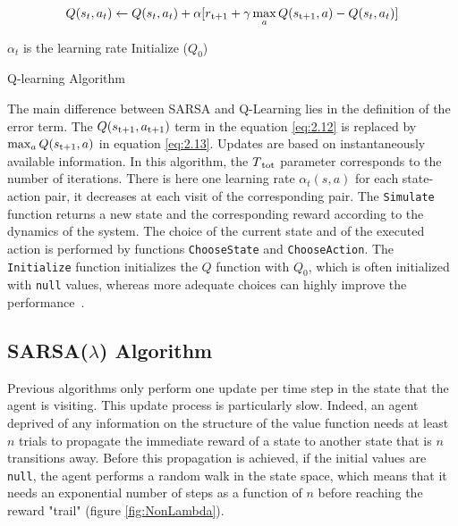 \begin{equation}
\label{eq:2.13}
	Q(s_t, a_t) \leftarrow Q(s_t, a_t) + \alpha[r\textsubscript{t+1} + \gamma \max_{a} Q(s\textsubscript{t+1}, a) - Q(s_t, a_t)]
\end{equation} 

\begin{algorithm}
	$\alpha_t$ is the learning rate \;
	Initialize ($Q_0$)\;
\caption{Q-learning Algorithm ~\cite{Sigaud:2010:MDP:1841781}}
\end{algorithm}

The main difference between SARSA and Q-Learning lies in the definition of the error term. The $Q(s\textsubscript{t+1}, a\textsubscript{t+1})$ term in the equation \ref{eq:2.12}	is replaced by $\max_{a}Q(s\textsubscript{t+1}, a)$ in equation \ref{eq:2.13}. Updates are based on instantaneously available information. In this algorithm, the $T\textsubscript{tot}$ parameter corresponds to the number of iterations. There is here one learning rate $\alpha_t(s, a)$ for each state-action pair, it decreases at each visit of the corresponding  pair. The {\tt Simulate} function returns a new state and the corresponding reward according to the dynamics of the system. The choice of the current state and of the executed action is performed by functions {\tt ChooseState} and {\tt ChooseAction}. The {\tt Initialize} function initializes the $Q$ function with $Q_0$, which is often initialized with {\tt null} values, whereas more adequate choices can highly improve the performance~\cite{Sigaud:2010:MDP:1841781}.

\subsection{SARSA($\lambda$) Algorithm} Previous algorithms only perform one update per time step in the state that the agent is visiting. This update process is particularly slow. Indeed, an agent deprived of any information on the structure of the value function needs at least $n$ trials to propagate the immediate reward of a state to another state that is $n$ transitions away. Before this propagation is achieved, if the initial values are {\tt null}, the agent performs a random walk in the state space, which means that it needs an exponential number of steps as a function of $n$ before reaching the reward "trail" (figure \ref{fig:NonLambda}).

